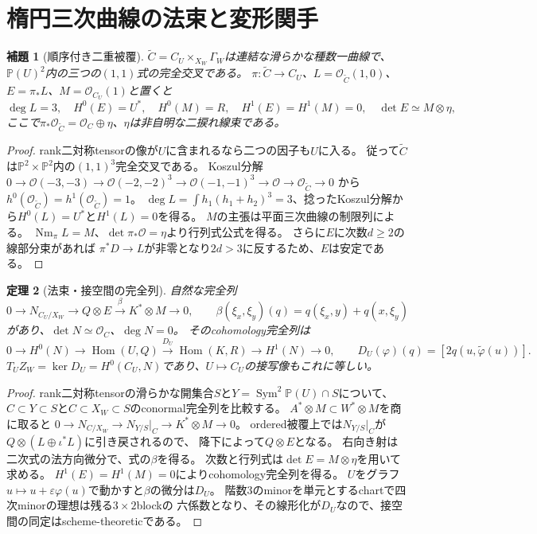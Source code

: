 \documentclass[11pt,a4paper]{ltjsarticle}
\newtheorem{theorem}{定理}[section]
\newtheorem{lemma}[theorem]{補題}
\newcommand{\PP}{\mathbb P}
\newcommand{\OO}{\mathcal O}
\newcommand{\Sym}{\operatorname{Sym}}
\newcommand{\Hom}{\operatorname{Hom}}
\begin{document}
\section{楕円三次曲線の法束と変形関手}
\begin{lemma}[順序付き二重被覆]
$\widetilde C=C_U\times_{X_W}\Gamma_W$は連結な滑らかな種数一曲線で、
$\PP(U)^2$内の三つの$(1,1)$式の完全交叉である。
$\pi:\widetilde C\to C_U$、$L=\OO_{\widetilde C}(1,0)$、
$E=\pi_*L$、$M=\OO_{C_U}(1)$と置くと
\[
\deg L=3,\quad H^0(E)=U^*,\quad H^0(M)=R,\quad
H^1(E)=H^1(M)=0,\quad \det E\simeq M\otimes\eta,
\]
ここで$\pi_*\OO_{\widetilde C}=\OO_C\oplus\eta$、$\eta$は非自明な二捩れ線束である。
\end{lemma}
\begin{proof}
rank二対称tensorの像が$U$に含まれるなら二つの因子も$U$に入る。
従って$\widetilde C$は$\PP^2\times\PP^2$内の$(1,1)^3$完全交叉である。
Koszul分解
$0\to\OO(-3,-3)\to\OO(-2,-2)^3\to\OO(-1,-1)^3\to\OO\to\OO_{\widetilde C}\to0$
から$h^0(\OO_{\widetilde C})=h^1(\OO_{\widetilde C})=1$。
$\deg L=\int h_1(h_1+h_2)^3=3$、捻ったKoszul分解から$H^0(L)=U^*$と$H^1(L)=0$を得る。
$M$の主張は平面三次曲線の制限列による。
$\operatorname{Nm}_\pi L=M$、$\det\pi_*\OO=\eta$より行列式公式を得る。
さらに$E$に次数$d\ge2$の線部分束があれば
$\pi^*D\to L$が非零となり$2d>3$に反するため、$E$は安定である。
\end{proof}
\begin{theorem}[法束・接空間の完全列]\label{thm:normal}
自然な完全列
\[
0\to N_{C_U/X_W}\to Q\otimes E
 \overset{\beta}{\longrightarrow}K^*\otimes M\to0,\qquad
\beta(\xi_x,\xi_y)(q)=q(\xi_x,y)+q(x,\xi_y)
\]
があり、$\det N\simeq\OO_C$、$\deg N=0$。
そのcohomology完全列は
\[
0\to H^0(N)\to\Hom(U,Q)\overset{D_U}{\longrightarrow}
\Hom(K,R)\to H^1(N)\to0,\qquad
D_U(\varphi)(q)=[2q(u,\widetilde\varphi(u))].
\]
$T_UZ_W=\ker D_U=H^0(C_U,N)$であり、$U\mapsto C_U$の接写像もこれに等しい。
\end{theorem}
\begin{proof}
rank二対称tensorの滑らかな開集合$S$と$Y=\Sym^2\PP(U)\cap S$について、
$C\subset Y\subset S$と$C\subset X_W\subset S$のconormal完全列を比較する。
$A^*\otimes M\subset W^*\otimes M$を商に取ると
$0\to N_{C/X_W}\to N_{Y/S}|_C\to K^*\otimes M\to0$。
ordered被覆上では$N_{Y/S}|_C$が$Q\otimes(L\oplus\iota^*L)$に引き戻されるので、
降下によって$Q\otimes E$となる。
右向き射は二次式の法方向微分で、式の$\beta$を得る。
次数と行列式は$\det E=M\otimes\eta$を用いて求める。
$H^1(E)=H^1(M)=0$によりcohomology完全列を得る。
$U$をグラフ$u\mapsto u+\varepsilon\varphi(u)$で動かすと$\beta$の微分は$D_U$。
階数3のminorを単元とするchartで四次minorの理想は残る$3\times2$blockの
六係数となり、その線形化が$D_U$なので、接空間の同定はscheme-theoreticである。
\end{proof}
\end{document}
